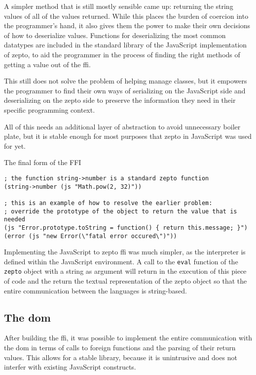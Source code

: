 \documentclass[oneside,11pt,xetex]{scrbook}
\begin{document}
A simpler method that is still mostly sensible came up: returning the string
values of all of the values returned. While this places the burden of coercion
into the programmer's hand, it also gives them the power to make their own 
decisions of how to deserialize values. Functions for deserializing the most
common datatypes are included in the standard library of the JavaScript
implementation of zepto, to aid the programmer in the process of finding
the right methods of getting a value out of the \gls{ffi}.

This still does not solve the problem of helping manage classes, but it empowers
the programmer to find their own ways of serializing on the JavaScript side
and deserializing on the zepto side to preserve the information they need in
their specific programming context.

All of this needs an additional layer of abstraction to avoid unnecessary
boiler plate, but it is stable enough for most purposes that zepto in JavaScript
was used for yet.

\begin{listing}[H]
\caption{The final form of the FFI}
\begin{verbatim}
; the function string->number is a standard zepto function
(string->number (js "Math.pow(2, 32)"))

; this is an example of how to resolve the earlier problem:
; override the prototype of the object to return the value that is needed
(js "Error.prototype.toString = function() { return this.message; }")
(error (js "new Error(\"fatal error occured\")"))
\end{verbatim}
\end{listing}

Implementing the JavaScript to zepto \gls{ffi} was much simpler, as the
interpreter is defined within the JavaScript environment. A call to the
\texttt{eval} function of the \texttt{zepto} object with a string as argument
will return in the execution of this piece of code and the return the textual
representation of the zepto object so that the entire communication between
the languages is string-based.

\subsection{The \gls{dom}}

After building the \gls{ffi}, it was possible to implement the entire
communication with the \gls{dom} in terms of calls to foreign functions
and the parsing of their return values. This allows for a stable library,
because it is unintrusive and does not interfer with existing JavaScript
constructs.
\end{document}

